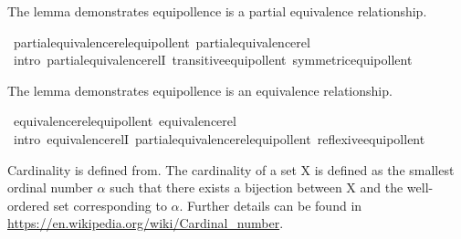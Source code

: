 \begin{isabellebody}
%
\endisadelimproof
%
\begin{isamarkuptext}%
The lemma demonstrates equipollence is a partial equivalence relationship.%
\end{isamarkuptext}\isamarkuptrue%
\isamarkupfalse%
\ partial{\isacharunderscore}{\kern0pt}equivalence{\isacharunderscore}{\kern0pt}rel{\isacharunderscore}{\kern0pt}equipollent{\isacharcolon}{\kern0pt}\ {\isachardoublequoteopen}partial{\isacharunderscore}{\kern0pt}equivalence{\isacharunderscore}{\kern0pt}rel\ {\isacharparenleft}{\kern0pt}{\isasymapprox}{\isacharparenright}{\kern0pt}{\isachardoublequoteclose}\isanewline
%
\isadelimproof
\ \ %
\endisadelimproof
%
\isatagproof
{}\isamarkupfalse%
\ {\isacharparenleft}{\kern0pt}intro\ partial{\isacharunderscore}{\kern0pt}equivalence{\isacharunderscore}{\kern0pt}relI\ transitive{\isacharunderscore}{\kern0pt}equipollent\ symmetric{\isacharunderscore}{\kern0pt}equipollent{\isacharparenright}{\kern0pt}%
\endisatagproof
{\isafoldproof}%
%
\isadelimproof
%
\endisadelimproof
%
\begin{isamarkuptext}%
The lemma demonstrates equipollence is an equivalence relationship.%
\end{isamarkuptext}\isamarkuptrue%
\isamarkupfalse%
\ equivalence{\isacharunderscore}{\kern0pt}rel{\isacharunderscore}{\kern0pt}equipollent{\isacharcolon}{\kern0pt}\ {\isachardoublequoteopen}equivalence{\isacharunderscore}{\kern0pt}rel\ {\isacharparenleft}{\kern0pt}{\isasymapprox}{\isacharparenright}{\kern0pt}{\isachardoublequoteclose}\isanewline
%
\isadelimproof
\ \ %
\endisadelimproof
%
\isatagproof
{}\isamarkupfalse%
\ {\isacharparenleft}{\kern0pt}intro\ equivalence{\isacharunderscore}{\kern0pt}relI\ partial{\isacharunderscore}{\kern0pt}equivalence{\isacharunderscore}{\kern0pt}rel{\isacharunderscore}{\kern0pt}equipollent\ reflexive{\isacharunderscore}{\kern0pt}equipollent{\isacharparenright}{\kern0pt}%
\endisatagproof
{\isafoldproof}%
%
\isadelimproof
%
\endisadelimproof
%
\isadelimdocument
%
\endisadelimdocument
%
\isatagdocument
%
\isamarkuptrue%
%
\endisatagdocument
{\isafolddocument}%
%
\isadelimdocument
%
\endisadelimdocument
%
\begin{isamarkuptext}%
Cardinality is defined from\cite{ZFC_in_HOL_AFP}. The cardinality of a set X is defined as the 
smallest ordinal number $\alpha$ such that there 
exists a bijection between X and the well-ordered set corresponding to $\alpha$.
Further details can be found in \url{https://en.wikipedia.org/wiki/Cardinal_number}.%

\end{isamarkuptext}
\end{isabellebody}
